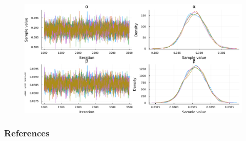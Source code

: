 \documentclass[11pt]{beamer}
\begin{document}
\begin{frame}
	\begin{figure}
		\includegraphics[scale=0.35]{images/chain_resultados.pdf}
	\end{figure}
\end{frame}

\begin{frame}[allowframebreaks]
        \frametitle{References}
		

       
\end{frame}
\end{document}
